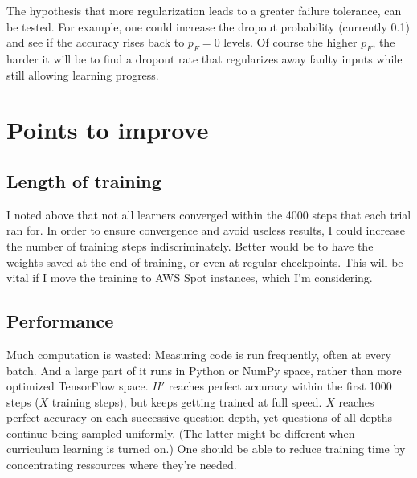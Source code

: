 \documentclass{farlamp}
\begin{document}
The hypothesis that more regularization leads to a greater failure tolerance,
can be tested. \TODO For example, one could increase the dropout probability
(currently 0.1) and see if the accuracy rises back to $p_F = 0$ levels. Of
course the higher $p_F$, the harder it will be to find a dropout rate that
regularizes away faulty inputs while still allowing learning progress.


\section{Points to improve}

\subsection{Length of training}

I noted above that not all learners converged within the 4000 steps that each
trial ran for. In order to ensure convergence and avoid useless results, I could
increase the number of training steps indiscriminately. Better would be to have
the weights saved at the end of training, or even at regular checkpoints. This
will be vital if I move the training to AWS Spot instances, which I'm
considering.


\subsection{Performance}

Much computation is wasted: Measuring code is run frequently, often at every
batch. And a large part of it runs in Python or NumPy space, rather than more
optimized TensorFlow space. $H'$ reaches perfect accuracy within the first 1000
steps ($X$ training steps), but keeps getting trained at full speed. $X$ reaches
perfect accuracy on each successive question depth, yet questions of all depths
continue being sampled uniformly. (The latter might be different when curriculum
learning is turned on.) One should be able to reduce training time by
concentrating ressources where they're needed.
\end{document}
